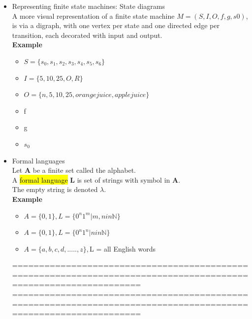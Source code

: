 \documentclass{article}
\begin{document}
\begin{itemize}
\item Representing finite state machines: State diagrams\\
A more visual representation of a finite state machine
$M = (S, I, O, f , g,s0)$, is via a digraph, with one vertex per state and one
directed edge per transition, each decorated with input and output.\\
\textbf{Example}
\begin{itemize}
\item $S = \{s_0,s_1,s_2,s_3,s_4,s_5,s_6\}$
\item $I = \{5,10,25,O,R\}$
\item $O = \{n,5,10,25,orange juice,apple juice\}$
\item f
\item g
\item $s_0$
\end{itemize}


\item Formal languages\\
Let \textbf{A} be a finite set called the alphabet.\\
A \hl{formal language} \textbf{L} is set of strings with symbol in \textbf{A}.\\
The empty string is denoted $\lambda$.\\
\textbf{Example}
\begin{itemize}
\item $A = \{0,1\}, L = \{0^{n}1^m | m,n in \mathbb{N}\}$
\item $A = \{0,1\}, L = \{0^{n}1^n |  n in \mathbb{N}\}$
\item $A = \{a,b,c,d,.....,z\}, $L = all English words
\end{itemize}


================================================================================================================
\newpage
================================================================================================================\\


\end{itemize}
\end{document}
